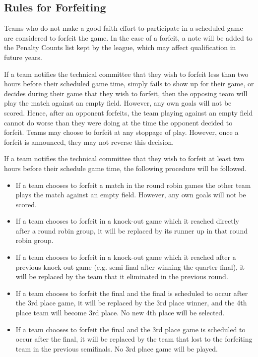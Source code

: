 \documentclass[12pt]{article}
\begin{document}
\subsection{Rules for Forfeiting}
\label{sec:forfeit}

Teams who do not make a good faith effort to participate in a scheduled game are considered to forfeit the game.  In the case of a forfeit, a note will be added to the Penalty Counts list kept by the league, which may affect qualification in future years.

If a team notifies the technical committee that they wish to forfeit less than two hours before their scheduled game time, simply fails to show up for their game, or decides during their game that they wish to forfeit, then the opposing team will play the match against an empty field.  However, any own goals will not be scored.  Hence, after an opponent forfeits, the team playing against an empty field cannot do worse than they were doing at the time the opponent decided to forfeit.  Teams may choose to forfeit at any stoppage of play.  However, once a forfeit is announced, they may not reverse this decision.

If a team notifies the technical committee that they wish to forfeit at least two hours before their schedule game time, the following procedure will be followed.

\begin{itemize}
\item If a team chooses to forfeit a match in the round robin games the other team plays the match against an empty field.  However, any own goals will not be scored.
\item If a team chooses to forfeit in a knock-out game which it reached directly after a round robin group, it will be replaced by its runner up in that round robin group.
\item If a team chooses to forfeit in a knock-out game which it reached after a previous knock-out game (e.g. semi final after winning the quarter final), it will be replaced by the team that it eliminated in the previous round.
\item If a team chooses to forfeit the final and the final is scheduled to occur after the 3rd place game, it will be replaced by the 3rd place winner, and the 4th place team will become 3rd place. No new 4th place will be selected.
\item If a team chooses to forfeit the final and the 3rd place game is scheduled to occur after the final, it will be replaced by the team that lost to the forfeiting team in the previous semifinals. No 3rd place game will be played.
\end{itemize}
\end{document}
